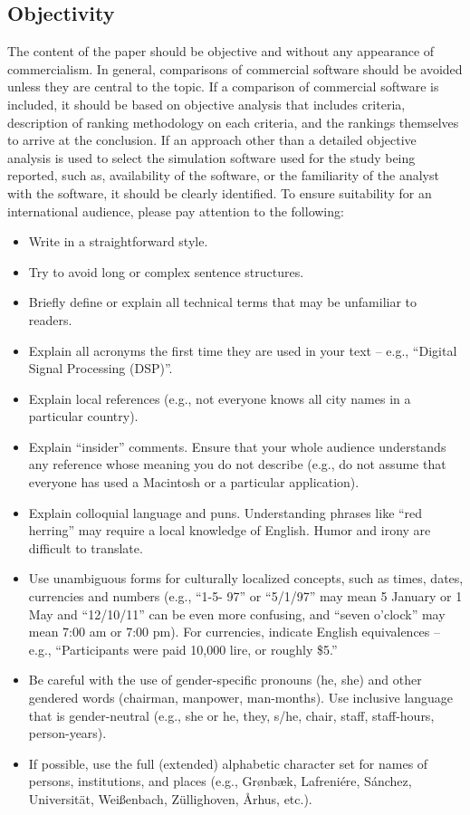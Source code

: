 \documentclass{scspaperproc}
\theoremstyle{scsthe}
\begin{document}
\subsection{Objectivity}
The content of the paper should be objective and without any appearance of commercialism.  In general, comparisons of commercial software should be avoided unless they are central to the topic.  If a comparison of commercial software is included, it should be based on objective analysis that includes criteria, description of ranking methodology on each criteria, and the rankings themselves to arrive at the conclusion.
If an approach other than a detailed objective analysis is used to select the simulation software used for the study being reported, such as, availability of the software, or the familiarity of the analyst with the software, it should be clearly identified. To ensure suitability for an international audience, please pay attention to the following:

\begin{itemize}
\item{Write in a straightforward style.}
\item{Try to avoid long or complex sentence structures.}
\item{Briefly define or explain all technical terms that may be unfamiliar to readers.}
\item{Explain all acronyms the first time they are used in your text – e.g., “Digital Signal Processing (DSP)”.}
\item{Explain local references (e.g., not everyone knows all city names in a particular country).}
\item{Explain “insider” comments. Ensure that your whole audience understands any reference whose meaning you do not describe (e.g., do not assume that everyone has used a Macintosh or a particular application).}
\item{Explain colloquial language and puns. Understanding phrases like “red herring” may require a local knowledge of English. Humor and irony are difficult to translate.}
\item{Use unambiguous forms for culturally localized concepts, such as times, dates, currencies and numbers (e.g., “1-5- 97” or “5/1/97” may mean 5 January or 1 May and “12/10/11” can be even more confusing, and “seven o’clock” may mean 7:00 am or 7:00 pm).  For currencies, indicate English equivalences – e.g., “Participants were paid 10,000 lire, or roughly \$5.”}
\item{Be careful with the use of gender-specific pronouns (he, she) and other gendered words (chairman, manpower, man-months). Use inclusive language that is gender-neutral (e.g., she or he, they, s/he, chair, staff, staff-hours, person-years).}
\item{If possible, use the full (extended) alphabetic character set for names of persons, institutions, and places (e.g., {Gr\o nb\ae k}, Lafreni\'ere, S\'anchez, Universit\"at, {Wei\ss enbach}, Z\"ullighoven, {\AA rhus}, etc.).}
\end{itemize}
\end{document}
